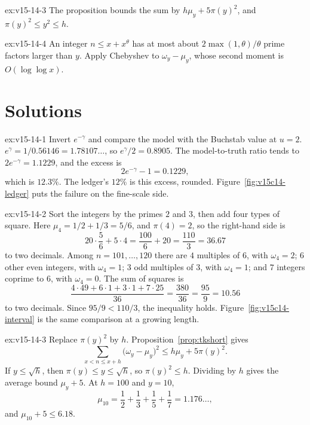 \begin{hint}{ex:v15-14-3}
The proposition bounds the sum by \(h\mu_y+5\pi(y)^2\), and \(\pi(y)^2\le y^2\le h\).
\end{hint}

\begin{hint}{ex:v15-14-4}
An integer \(n\le x+x^{\theta}\) has at most about \(2\max(1,\theta)/\theta\) prime factors larger than \(y\). Apply Chebyshev to \(\omega_y-\mu_y\), whose second moment is \(O(\log\log x)\).
\end{hint}

\section{Solutions}

\begin{solution}{ex:v15-14-1}
\idea Invert \(e^{-\gamma}\) and compare the model with the Buchstab value at \(u=2\).
\writeup \(e^{\gamma}=1/0.56146=1.78107\ldots\), so \(e^{\gamma}/2=0.8905\). The model-to-truth ratio tends to \(2e^{-\gamma}=1.1229\), and the excess is
\[
2e^{-\gamma}-1=0.1229,
\]
which is \(12.3\%\). The ledger's \(12\%\) is this excess, rounded. Figure~\ref{fig:v15c14-ledger} puts the failure on the fine-scale side.
\end{solution}

\begin{solution}{ex:v15-14-2}
\idea Sort the integers by the primes \(2\) and \(3\), then add four types of square.
\writeup Here \(\mu_4=1/2+1/3=5/6\), and \(\pi(4)=2\), so the right-hand side is
\[
20\cdot\frac56+5\cdot4=\frac{100}6+20=\frac{110}3=36.67
\]
to two decimals. Among \(n=101,\dots,120\) there are \(4\) multiples of \(6\), with \(\omega_4=2\); \(6\) other even integers, with \(\omega_4=1\); \(3\) odd multiples of \(3\), with \(\omega_4=1\); and \(7\) integers coprime to \(6\), with \(\omega_4=0\). The sum of squares is
\[
\frac{4\cdot49+6\cdot1+3\cdot1+7\cdot25}{36}=\frac{380}{36}=\frac{95}9=10.56
\]
to two decimals. Since \(95/9<110/3\), the inequality holds. Figure~\ref{fig:v15c14-interval} is the same comparison at a growing length.
\end{solution}

\begin{solution}{ex:v15-14-3}
\idea Replace \(\pi(y)^2\) by \(h\).
\writeup Proposition~\ref{prop:tkshort} gives
\[
\sum_{x<n\le x+h}\bigl(\omega_y-\mu_y\bigr)^2\le h\mu_y+5\pi(y)^2.
\]
If \(y\le\sqrt h\), then \(\pi(y)\le y\le\sqrt h\), so \(\pi(y)^2\le h\). Dividing by \(h\) gives the average bound \(\mu_y+5\). At \(h=100\) and \(y=10\),
\[
\mu_{10}=\frac12+\frac13+\frac15+\frac17=1.176\ldots,
\]
and \(\mu_{10}+5\le6.18\).
\end{solution}

